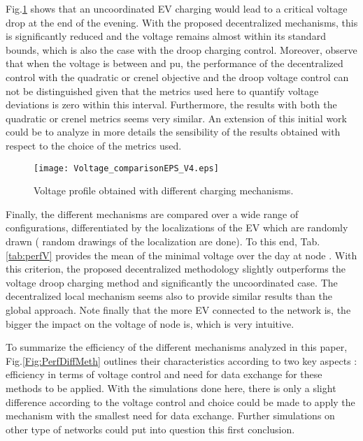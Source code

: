 \documentclass[journal]{IEEEtran}
\begin{document}
Fig.\ref{Fig:VDiffApp} shows that an uncoordinated EV charging would lead to a critical voltage drop at the end of the evening. With the proposed decentralized mechanisms, this is significantly reduced and the voltage remains almost within its standard bounds, which is also the case with the droop charging control. Moreover, observe that when the voltage is between  and  pu, the performance of the decentralized control with the quadratic or crenel objective and the droop voltage control can not be distinguished given that the metrics  used here to quantify voltage deviations is zero within this interval. Furthermore, the results with both the quadratic or crenel metrics seems very similar. An extension of this initial work could be to analyze in more details the sensibility of the results obtained with respect to the choice of the metrics used.

\begin{figure}[!htbp]
\texttt{[image: Voltage\_comparisonEPS\_V4.eps]}
\caption{Voltage profile obtained with different charging mechanisms.}
\label{Fig:VDiffApp}
\end{figure}



Finally, the different mechanisms are compared over a wide range of configurations, differentiated by the localizations of the EV which are randomly drawn ( random drawings of the localization are done). To this end, Tab.\ref{tab:perfV} provides the mean of the minimal voltage over the day at node . With this criterion, the proposed decentralized methodology slightly outperforms the voltage droop charging method and significantly the uncoordinated case. The decentralized local mechanism seems also to provide similar results than the global approach. Note finally that the more EV connected to the network is, the bigger the impact on the voltage of node  is, which is very intuitive. 

To summarize the efficiency of the different mechanisms analyzed in this paper, Fig.\ref{Fig:PerfDiffMeth} outlines their characteristics according to two key aspects : efficiency in terms of voltage control and need for data exchange for these methods to be applied. With the simulations done here, there is only a slight difference according to the voltage control and choice could be made to apply the mechanism with the smallest need for data exchange. Further simulations on other type of networks could put into question this first conclusion.
\end{document}
